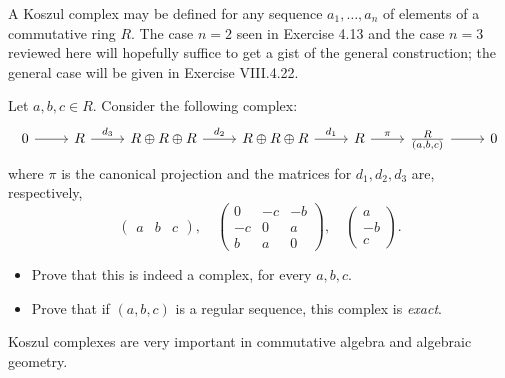 \documentclass[../../master.tex]{subfiles}
\begin{document}
\begin{problem}
    A Koszul complex may be defined for any sequence $a_1, \ldots, a_n$ of elements of a commutative ring $R$.
    The case $n = 2$ seen in Exercise 4.13 and the case $n = 3$ reviewed here will hopefully suffice to get a gist of the general construction;
    the general case will be given in Exercise VIII.4.22.

    Let $a, b, c \in R$. 
    Consider the following complex:
    \[
    \begin{tikzcd}
        0 & R & R \oplus R \oplus R & R \oplus R \oplus R & R & \frac{R}{(a, b, c)} & 0
        \arrow[from=1-1, to=1-2] 
        \arrow[from=1-2, to=1-3, "d_3"] 
        \arrow[from=1-3, to=1-4, "d_2"] 
        \arrow[from=1-4, to=1-5, "d_1"] 
        \arrow[from=1-5, to=1-6, "\pi"] 
        \arrow[from=1-6, to=1-7] 
    \end{tikzcd}
    \]
    where $\pi$ is the canonical projection and the matrices for $d_1, d_2, d_3$ are, respectively,
    \[
    \begin{pmatrix}
        a & b & c
    \end{pmatrix}, \quad
    \begin{pmatrix}
        0 & -c & -b \\
        -c & 0 & a \\
        b & a & 0
    \end{pmatrix}, \quad
    \begin{pmatrix}
        a \\
        -b \\
        c
    \end{pmatrix}.
    \]
    \begin{itemize}
        \item Prove that this is indeed a complex, for every $a, b, c$.
        \item Prove that if $(a, b, c)$ is a regular sequence, this complex is \textit{exact}.
    \end{itemize}
    Koszul complexes are very important in commutative algebra and algebraic geometry.
\end{problem}
\end{document}
